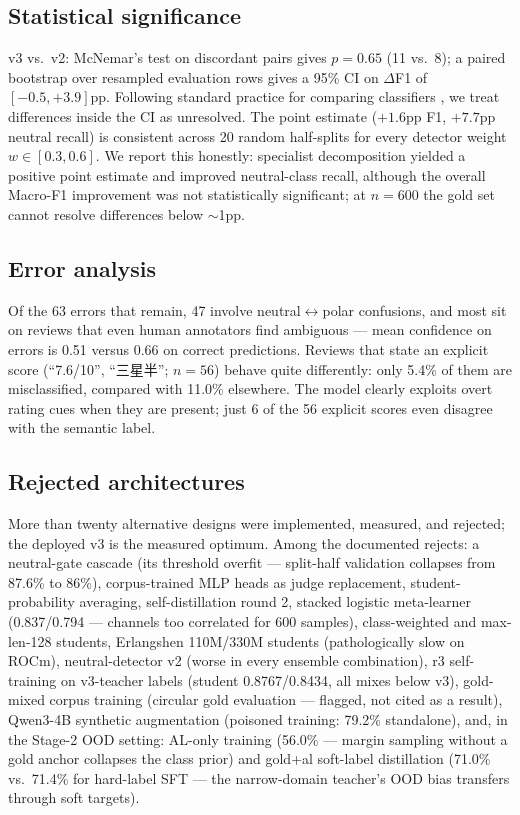 \documentclass[11pt,a4paper]{article}
\begin{document}
\subsection{Statistical significance}

v3 vs.\ v2: McNemar's test \citep{mcnemar1947} on discordant pairs
gives $p = 0.65$ (11 vs.\ 8); a paired bootstrap over resampled
evaluation rows \citep{efron1993} gives a 95\% CI on $\Delta$F1 of
$[-0.5, +3.9]$pp. Following standard practice for comparing
classifiers \citep{dietterich1998,demsar2006,dror2018}, we treat
differences
inside the CI as unresolved. The point estimate
($+1.6$pp F1, $+7.7$pp neutral recall) is consistent across 20 random
half-splits for every detector weight $w \in [0.3,0.6]$. We report this
honestly: specialist decomposition yielded a positive point estimate
and improved neutral-class recall, although the overall Macro-F1
improvement was not statistically significant; at $n=600$ the gold
set cannot resolve differences below $\sim$1pp.

\subsection{Error analysis}

Of the 63 errors that remain, 47 involve neutral$\leftrightarrow$polar
confusions, and most sit on reviews that even human annotators find
ambiguous --- mean confidence on errors is 0.51 versus 0.66 on
correct predictions. Reviews that state an explicit score
(``7.6/10'', ``三星半''; $n=56$) behave quite differently: only 5.4\%
of them are misclassified, compared with 11.0\% elsewhere. The model
clearly exploits overt rating cues when they are present; just 6 of
the 56 explicit scores even disagree with the semantic label.

\subsection{Rejected architectures}

More than twenty alternative designs were implemented, measured, and
rejected; the deployed v3 is the measured optimum. Among the documented
rejects: a neutral-gate cascade (its threshold overfit --- split-half
validation collapses from 87.6\% to 86\%), corpus-trained MLP heads as judge
replacement, student-probability averaging, self-distillation round 2,
stacked logistic meta-learner (0.837/0.794 --- channels too correlated
for 600 samples), class-weighted and max-len-128 students, Erlangshen
110M/330M students (pathologically slow on ROCm), neutral-detector v2
(worse in every ensemble combination), r3 self-training on v3-teacher
labels (student 0.8767/0.8434, all mixes below v3), gold-mixed corpus
training (circular gold evaluation --- flagged, not cited as a result),
Qwen3-4B synthetic augmentation (poisoned training: 79.2\%
standalone), and, in the Stage-2 OOD setting: AL-only training
(56.0\% --- margin sampling without a gold anchor collapses the class
prior) and gold+al soft-label distillation (71.0\% vs.\ 71.4\% for
hard-label SFT --- the narrow-domain teacher's OOD bias transfers
through soft targets).
\end{document}
